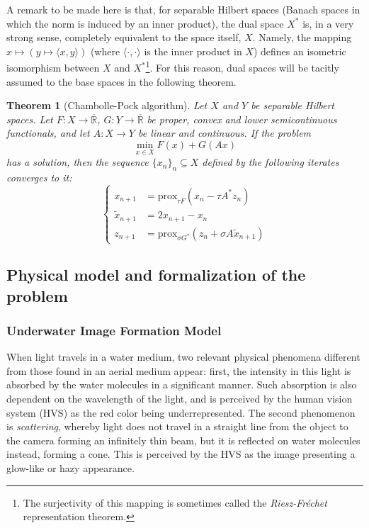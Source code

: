 \documentclass[twocolumn,twoside,a4paper,10pt]{IEEEtran}
\newtheorem{theorem}{Theorem}
\begin{document}
A remark to be made here is that, for separable Hilbert spaces (Banach spaces in which the norm is induced by an inner product), the dual space \(X^*\) is,
in a very strong sense, completely equivalent to the space itself, \(X\). Namely,
the mapping \( x\mapsto (y\mapsto \langle x,y\rangle)\) (where \(\langle\cdot,\cdot\rangle\) is the inner product in \(X\)) defines an isometric isomorphism between \(X\) and \(X^*\)\footnote{The surjectivity of this mapping is sometimes called the \textit{Riesz-Fréchet} representation theorem.}. For this reason, dual spaces will be tacitly assumed to the base spaces in the following
theorem.

\begin{theorem}[Chambolle-Pock algorithm]\label{thm:chambolle-pock}
  Let \(X\) and \(Y\) be separable Hilbert spaces. Let \(F\colon X\to\overline{\mathbb{R}}\), \(G\colon Y\to\overline{\mathbb{R}}\) be proper, convex and lower semicontinuous functionals, and let \(A\colon X\to Y\) be linear and continuous. If the problem
  \[
    \min_{x\in X}F(x) + G(Ax)
  \]
  has a solution, then the sequence \(\{x_n\}_n\subseteq X\) defined by the following iterates converges to it:
  \begin{equation}\label{eq:iterates}
    \left\{
    \begin{split}
      x_{n+1} & = \text{prox}_{\tau F}(x_n - \tau A^*z_n) \\
      \tilde{x}_{n+1} & = 2x_{n+1} - x_n \\
      z_{n+1} & = \text{prox}_{\sigma G^*}(z_n + \sigma A\tilde{x}_{n+1})
    \end{split}
    \right.
  \end{equation}
\end{theorem}

\subsection{Physical model and formalization of the problem} \label{subsec:physical-model}
\subsubsection{Underwater Image Formation Model}
When light travels in a water medium, two relevant physical phenomena different from those found in an aerial medium appear: first, the intensity in this light
is absorbed by the water molecules in a significant manner. Such absorption is
also dependent on the wavelength of the light, and is perceived by the human vision system (HVS) as the red color being underrepresented. The second phenomenon is
\textit{scattering}, whereby light does not travel in a straight line from the
object to the camera forming an infinitely thin beam, but it is reflected on water molecules instead, forming a cone. This is perceived by the HVS as the image
presenting a glow-like or hazy appearance.
\end{document}
